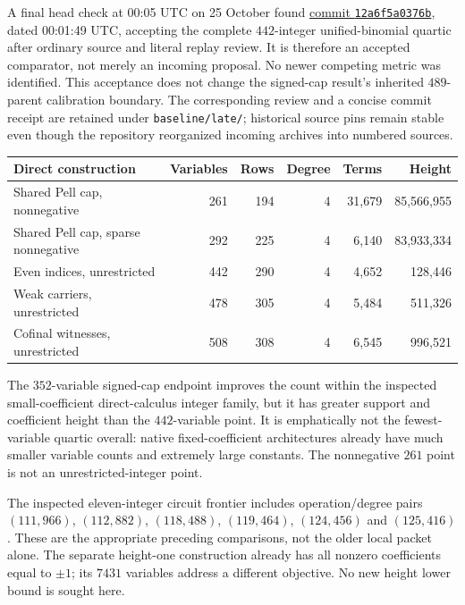A final head check at 00:05 UTC on 25 October found
\href{https://github.com/VladimirReshetnikov/ProveIt/commit/12a6f5a0376b288cc8175e6016ea2c1258dd4bd4}{commit
\texttt{12a6f5a0376b}}, dated 00:01:49 UTC, accepting the complete
$442$-integer unified-binomial quartic after ordinary source and literal
replay review. It is therefore an accepted comparator, not merely an incoming
proposal. No newer competing metric was identified. This acceptance does not
change the signed-cap result's inherited $489$-parent calibration boundary.
The corresponding review and a concise commit receipt are retained under
\texttt{baseline/late/}; historical source pins remain stable even though
the repository reorganized incoming archives into numbered sources.

\begin{center}\small
\begin{tabular}{lrrrrr}
\toprule
Direct construction & Variables & Rows & Degree & Terms & Height\\
\midrule
Shared Pell cap, nonnegative &261&194&4&31,679&85,566,955\\
Shared Pell cap, sparse nonnegative &292&225&4&6,140&83,933,334\\
Even indices, unrestricted &442&290&4&4,652&128,446\\
Weak carriers, unrestricted &478&305&4&5,484&511,326\\
Cofinal witnesses, unrestricted &508&308&4&6,545&996,521\\
\bottomrule
\end{tabular}\end{center}
The $352$-variable signed-cap endpoint improves the count within the inspected
small-coefficient direct-calculus integer family, but it has greater support
and coefficient height than the $442$-variable point. It is emphatically not
the fewest-variable quartic overall: native fixed-coefficient architectures
already have much smaller variable counts and extremely large constants.
The nonnegative $261$ point is not an unrestricted-integer point.

The inspected eleven-integer circuit frontier includes operation/degree pairs
$(111,966)$, $(112,882)$, $(118,488)$, $(119,464)$,
$(124,456)$ and $(125,416)$. These are the appropriate preceding comparisons,
not the older local packet alone. The separate height-one construction already
has all nonzero coefficients equal to $\pm1$; its $7431$ variables address a
different objective. No new height lower bound is sought here.


